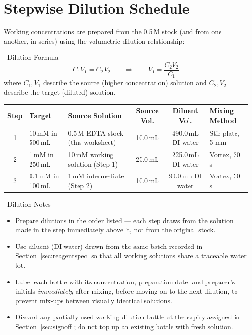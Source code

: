 \section{Stepwise Dilution Schedule}
\label{sec:dilution}

Working concentrations are prepared from the 0.5\,M stock (and from one another, in
series) using the volumetric dilution relationship:

\begin{calcbox}{\faVial\ Dilution Formula}
\[
C_1 V_1 = C_2 V_2 \qquad\Longrightarrow\qquad V_1 = \frac{C_2 V_2}{C_1}
\]
where $C_1, V_1$ describe the source (higher concentration) solution and $C_2, V_2$
describe the target (diluted) solution.
\end{calcbox}

\begin{tabularx}{\textwidth}{@{}cXXccX@{}}
\toprule
\textbf{Step} & \textbf{Target} & \textbf{Source Solution} & \textbf{Source Vol.} & \textbf{Diluent Vol.} & \textbf{Mixing Method} \\
\midrule
1 & 10\,mM in 500\,mL & 0.5\,M EDTA stock (this worksheet) & 10.0\,mL & 490.0\,mL DI water & Stir plate, 5 min \\
\rowcolor{labteal!5}
2 & 1\,mM in 250\,mL & 10\,mM working solution (Step 1) & 25.0\,mL & 225.0\,mL DI water & Vortex, 30 s \\
3 & 0.1\,mM in 100\,mL & 1\,mM intermediate (Step 2) & 10.0\,mL & 90.0\,mL DI water & Vortex, 30 s \\
\bottomrule
\end{tabularx}

\begin{notebox}{\faPen\ Dilution Notes}
\begin{itemize}[leftmargin=1.3em, itemsep=2pt]
  \item Prepare dilutions in the order listed --- each step draws from the solution made in
        the step immediately above it, not from the original stock.
  \item Use diluent (DI water) drawn from the same batch recorded in
        Section~\ref{sec:reagentspec} so that all working solutions share a traceable
        water lot.
  \item Label each bottle with its concentration, preparation date, and preparer's initials
        \emph{immediately} after mixing, before moving on to the next dilution, to prevent
        mix-ups between visually identical solutions.
  \item Discard any partially used working dilution bottle at the expiry assigned in
        Section~\ref{sec:signoff}; do not top up an existing bottle with fresh solution.
\end{itemize}
\end{notebox}
